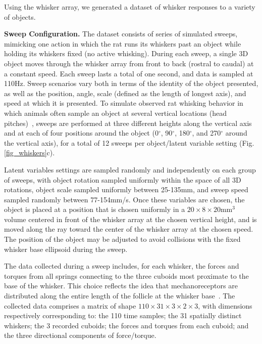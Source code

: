Using the whisker array, we generated a dataset of whisker responses to a variety of objects.   

\textbf{Sweep Configuration.}  The dataset consists of series of simulated sweeps, mimicking one action in which the rat runs its whiskers past an object while holding its whiskers fixed (no active whisking).   
During each sweep, a single 3D object moves through the whisker array from front to back (rostral to caudal) at a constant speed.  
Each sweep lasts a total of one second, and data is sampled at 110Hz. 
Sweep scenarios vary both in terms of the identity of the object presented, as well as the position, angle, scale (defined as the length of longest axis), and speed at which it is presented.   
To simulate observed rat whisking behavior in which animals often sample an object at several vertical locations (head pitches)~\cite{hobbs2015spatiotemporal}, sweeps are performed at three different heights along the vertical axis and at each of four positions around the object (0$^{\circ}$, 90$^{\circ}$, 180$^{\circ}$, and 270$^{\circ}$ around the vertical axis), for a total of 12 sweeps per object/latent variable setting (Fig. \ref{fig_whiskers}c). 

Latent variables settings are sampled randomly and independently on each group of sweeps, with object rotation sampled uniformly within the space of all 3D rotations, object scale sampled uniformly between 25-135mm, and sweep speed sampled randomly between 77-154mm/s.  
Once these variables are chosen, the object is placed at a position that is chosen uniformly in a  $20 \times 8 \times 20$mm$^{3}$ volume centered in front of the whisker array at the chosen vertical height, and is moved along the ray toward the center of the whisker array at the chosen speed. 
The position of the object may be adjusted to avoid collisions with the fixed whisker base ellipsoid during the sweep. 

The data collected during a sweep includes, for each whisker, the forces and torques from all springs connecting to the three cuboids most proximate to the base of the whisker.  This choice reflects the idea that mechanoreceptors are distributed along the entire length of the follicle at the whisker base~\cite{}.  
The collected data comprises a matrix of shape $110 \times 31 \times 3 \times 2 \times 3$, with dimensions respectively corresponding to: the 110 time samples;  the 31 spatially distinct whiskers; the 3 recorded cuboids; the forces and torques from each cuboid; and the three directional components of force/torque.   

